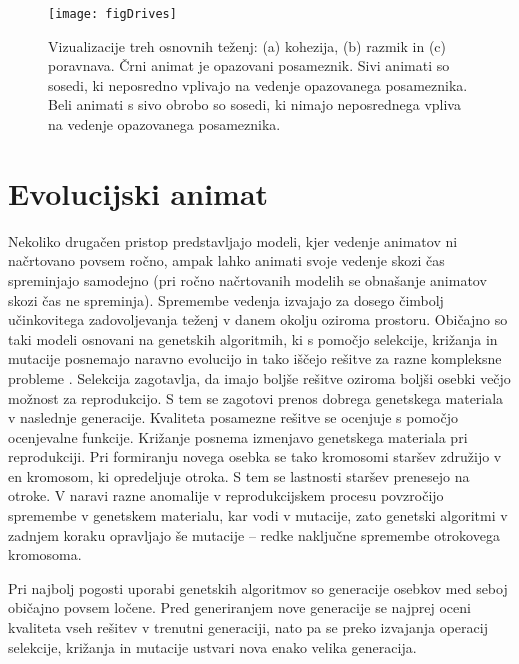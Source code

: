 \begin{razsirjeniPovzetek}
\begin{figure*}
  \texttt{[image: figDrives]}
  \caption{Vizualizacije treh osnovnih teženj: (a) kohezija, (b) razmik in (c) poravnava. Črni animat je opazovani posameznik. Sivi animati so sosedi, ki neposredno vplivajo na vedenje opazovanega posameznika. Beli animati s sivo obrobo so sosedi, ki nimajo neposrednega vpliva na vedenje opazovanega posameznika.}
  \label{fig:drives_si}
\end{figure*}

\section{Evolucijski animat}

Nekoliko drugačen pristop predstavljajo modeli, kjer vedenje animatov ni načrtovano povsem ročno, ampak lahko animati svoje vedenje skozi čas spreminjajo samodejno (pri ročno načrtovanih modelih se obnašanje animatov skozi čas ne spreminja). Spremembe vedenja izvajajo za dosego čimbolj učinkovitega zadovoljevanja teženj v danem okolju oziroma prostoru. Običajno so taki modeli osnovani na genetskih algoritmih, ki s pomočjo selekcije, križanja in mutacije posnemajo naravno evolucijo in tako iščejo rešitve za razne kompleksne probleme \cite{goldberg1989genetic,goldberg2002design,holland1992adaptation}. Selekcija zagotavlja, da imajo boljše rešitve oziroma boljši osebki večjo možnost za reprodukcijo. S tem se zagotovi prenos dobrega genetskega materiala v naslednje generacije. Kvaliteta posamezne rešitve se ocenjuje s pomočjo ocenjevalne funkcije. Križanje posnema izmenjavo genetskega materiala pri reprodukciji. Pri formiranju novega osebka se tako kromosomi staršev združijo v en kromosom, ki opredeljuje otroka. S tem se lastnosti staršev prenesejo na otroke. V naravi razne anomalije v reprodukcijskem procesu povzročijo spremembe v genetskem materialu, kar vodi v mutacije, zato genetski algoritmi v zadnjem koraku opravljajo še mutacije -- redke naključne spremembe otrokovega kromosoma.

Pri najbolj pogosti uporabi genetskih algoritmov so generacije osebkov med seboj običajno povsem ločene. Pred generiranjem nove generacije se najprej oceni kvaliteta vseh rešitev v trenutni generaciji, nato pa se preko izvajanja operacij selekcije, križanja in mutacije ustvari nova enako velika generacija.


\end{razsirjeniPovzetek}

